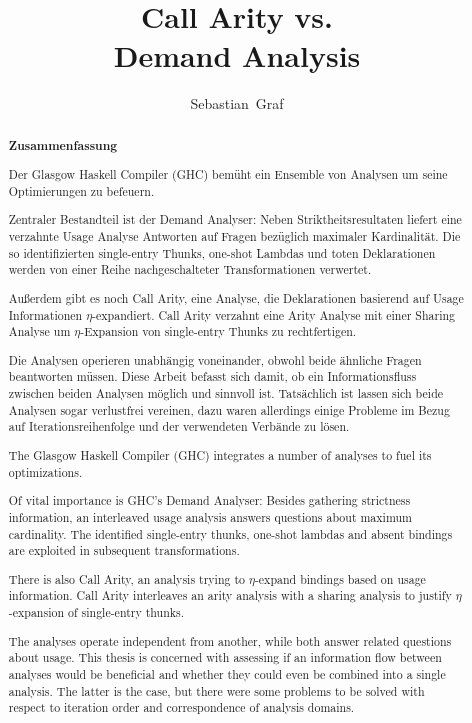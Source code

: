 \documentclass[12pt,a4paper,twoside,headings=openright]{scrreprt}
\title{Call Arity vs.\\Demand Analysis}
\author{Sebastian~Graf}
\begin{document}
\begin{otherlanguage}{ngerman} %
\mytitlepage
\end{otherlanguage}

\begin{abstract}
\begin{center}\Huge\textbf{\textsf{Zusammenfassung}}
\end{center}
\vfill

  Der Glasgow Haskell Compiler (GHC) bemüht ein Ensemble von Analysen um seine Optimierungen zu befeuern.

  Zentraler Bestandteil ist der Demand Analyser:
  Neben Striktheitsresultaten liefert eine verzahnte Usage Analyse Antworten auf Fragen bezüglich maximaler Kardinalität.
  Die so identifizierten single-entry Thunks, one-shot Lambdas und toten Deklarationen werden von einer Reihe nachgeschalteter Transformationen verwertet.

  Außerdem gibt es noch Call Arity, eine Analyse, die Deklarationen basierend auf Usage Informationen $\eta$-expandiert.
  Call Arity verzahnt eine Arity Analyse mit einer Sharing Analyse um $\eta$-Expansion von single-entry Thunks zu rechtfertigen.

  Die Analysen operieren unabhängig voneinander, obwohl beide ähnliche Fragen beantworten müssen.
  Diese Arbeit befasst sich damit, ob ein Informationsfluss zwischen beiden Analysen möglich und sinnvoll ist.
  Tatsächlich ist lassen sich beide Analysen sogar verlustfrei vereinen, dazu waren allerdings einige Probleme im Bezug auf Iterationsreihenfolge und der verwendeten Verbände zu lösen.

\vfill

  The Glasgow Haskell Compiler (GHC) integrates a number of analyses to fuel its optimizations.

  Of vital importance is GHC's Demand Analyser: Besides gathering strictness information, an interleaved usage analysis answers questions about maximum cardinality.
  The identified single-entry thunks, one-shot lambdas and absent bindings are exploited in subsequent transformations.

  There is also Call Arity, an analysis trying to $\eta$-expand bindings based on usage information. 
  Call Arity interleaves an arity analysis with a sharing analysis to justify $\eta$-expansion of single-entry thunks.

  The analyses operate independent from another, while both answer related questions about usage. 
  This thesis is concerned with assessing if an information flow between analyses would be beneficial and whether they could even be combined into a single analysis. 
  The latter is the case, but there were some problems to be solved with respect to iteration order and correspondence of analysis domains.

\vfill

\end{abstract}
\end{document}
